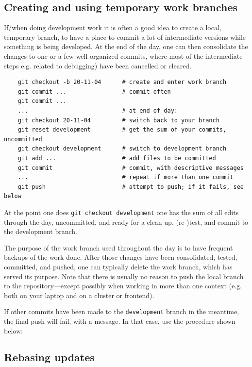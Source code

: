 \documentclass[paper=a4,fontsize=11pt]{scrartcl}
\numberwithin{equation}{section}		%
\numberwithin{figure}{section}			%
\numberwithin{table}{section}				%
\newcommand{\gitcolor}{\color{Brown}}
\newcommand{\Git}[1]{\texttt{\gitcolor #1}}
\newcommand{\git}[1]{\texttt{\gitcolor git #1}}
\begin{document}
\subsection{Creating and using temporary work branches}

If/when doing development work it is often a good idea to create a local, temporary branch, to have a place to commit a lot of intermediate versions while something is being developed.  At the end of the day, one can then consolidate the changes to one or a few well organized commits, where most of the intermediate steps e.g. related to debugging) have been cancelled or cleared.
{\gitcolor\begin{verbatim}
    git checkout -b 20-11-04      # create and enter work branch
    git commit ...                # commit often
    git commit ...
    ...                           # at end of day:
    git checkout 20-11-04         # switch back to your branch
    git reset development         # get the sum of your commits, uncommitted 
    git checkout development      # switch to development branch
    git add ...                   # add files to be committed
    git commit                    # commit, with descriptive messages
    ...                           # repeat if more than one commit
    git push                      # attempt to push; if it fails, see below
\end{verbatim}}

At the point one does \git{checkout development} one has the sum of all edits through the day, uncommitted, and ready for a clean up, (re-)test, and commit to the development branch.

The purpose of the work branch used throughout the day is to have frequent backups of the work done.  After those changes have been consolidated, tested, committed, and pushed, one can typically delete the work branch, which has served its purpose.  Note that there is usually no reason to push the local branch to the repository---except possibly when working in more than one context (e.g. both on your laptop and on a cluster or frontend).

If other commits have been made to the \Git{development} branch in the meantime, the final push will fail, with a message.  In that case, use the procedure shown below:

\subsection{Rebasing updates}
\end{document}
